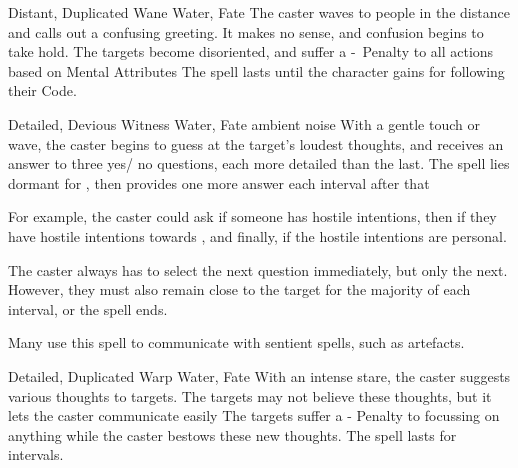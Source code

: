 \ifodd\value{diceNo}

  {Distant, Duplicated}%
  {Wane}%
  {Water, Fate}%
  {}%
  {
    The caster waves to people in the distance and calls out a confusing greeting.
    It makes no sense, and confusion begins to take hold.
    The targets become disoriented, and suffer a -~Penalty to all actions based on Mental Attributes}%
  {
    The spell lasts until the character gains  for following their Code.
  }

\else

  {Detailed, Devious}%
  {Witness}%
  {Water, Fate}%
  {ambient noise}%
  {With a gentle touch or wave, the caster begins to guess at the target's loudest thoughts, and receives an answer to three yes/ no questions, each more detailed than the last.
  The spell lies dormant for , then provides one more answer each interval after that}%
  {
  For example, the caster could ask if someone has hostile intentions, then if they have hostile intentions towards , and finally, if the hostile intentions are personal.

  The caster always has to select the next question immediately, but only the next.
  However, they must also remain close to the target for the majority of each \gls{interval}, or the spell ends.

  Many use this spell to communicate with sentient spells, such as \glspl{artefact}.}

  {Detailed, Duplicated}%
  {Warp}%
  {Water, Fate}%
  {}%
  {With an intense stare, the caster suggests various thoughts to  targets.
  The targets may not believe these thoughts, but it lets the caster communicate easily}%
  {The targets suffer a - Penalty to focussing on anything while the caster bestows these new thoughts.
  The spell lasts for  \glspl{interval}.}

\fi
{}
